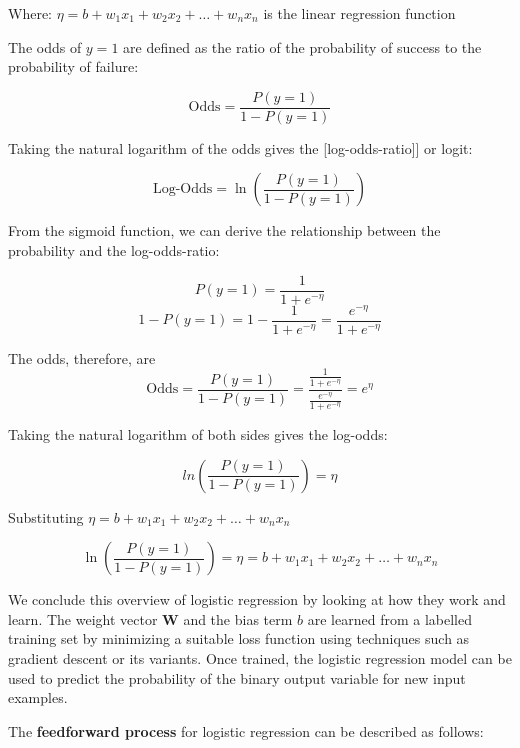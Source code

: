 \documentclass[conference]{IEEEtran}
\begin{document}
	Where:
	$\eta = b + w_1 x_1 + w_2 x_2 + \dots + w_n x_n$  is the linear regression function
	
	The odds of $y=1$ are defined as the ratio of the probability of success to the probability of failure:
	
	$$\text{Odds} = \frac{P(y = 1)}{1 - P(y = 1)}$$
	
	Taking the natural logarithm of the odds gives the 
	[log-odds-ratio]] or logit:
	
	$$\text{Log-Odds} = \ln\left(\frac{P(y = 1)}{1 - P(y = 1)}\right)$$
	
	From the sigmoid function, we can derive the relationship between the probability and the log-odds-ratio:
	
	$$P(y = 1) = \frac{1}{1 + e^{-\eta}}$$
	$$1 - P(y = 1) = 1 - \frac{1}{1 + e^{-\eta}} = \frac{e^{-\eta}}{1 + e^{-\eta}}$$
	
	The odds, therefore, are
	$$\text{Odds} = \frac{P(y = 1)}{1 - P(y = 1)} = \frac{\frac{1}{1 + e^{-\eta}}}{\frac{e^{-\eta}}{1 + e^{-\eta}}} = e^{\eta}$$
	
	
	Taking the natural logarithm of both sides gives the log-odds:
	
	$$ln\left(\frac{P(y = 1)}{1 - P(y = 1)}\right) = \eta$$
	
	Substituting $\eta = b + w_1 x_1 + w_2 x_2 + \dots + w_n x_n$
	
	\begin{equation}
		\ln\left(\frac{P(y = 1)}{1 - P(y = 1)}\right) = \eta = b + w_1 x_1 + w_2 x_2 + \dots + w_n x_n
	\end{equation}
	
	\bigskip
	
	We conclude this overview of logistic regression by looking at how they work and learn.	The weight vector $\textbf{W}$ and the bias term $b$ are learned from a labelled training set by minimizing a suitable loss function using techniques such as gradient descent or its variants. Once trained, the logistic regression model can be used to predict the probability of the binary output variable for new input examples.
	
			
	The \textbf{feedforward process} for logistic regression can be described as follows:
	
\end{document}
